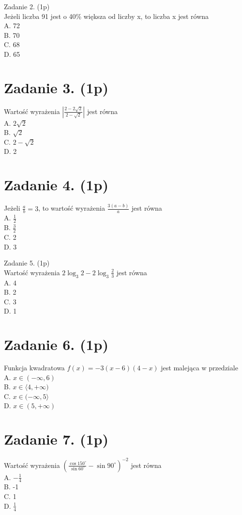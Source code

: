 \documentclass[10pt]{article}
\begin{document}
Zadanie 2. (1p)\\
Jeżeli liczba 91 jest o 40\% większa od liczby x, to liczba x jest równa\\
A. 72\\
B. 70\\
C. 68\\
D. 65

\section*{Zadanie 3. (1p)}
Wartość wyrażenia \(\left|\frac{2-2 \sqrt{2}}{2-\sqrt{2}}\right|\) jest równa\\
A. \(2 \sqrt{2}\)\\
B. \(\sqrt{2}\)\\
C. \(2-\sqrt{2}\)\\
D. 2

\section*{Zadanie 4. (1p)}
Jeżeli \(\frac{a}{b}=3\), to wartość wyrażenia \(\frac{3(a-b)}{a}\) jest równa\\
A. \(\frac{1}{2}\)\\
B. \(\frac{3}{2}\)\\
C. 2\\
D. 3

Zadanie 5. (1p)\\
Wartość wyrażenia \(2 \log _{3} 2-2 \log _{3} \frac{2}{3}\) jest równa\\
A. 4\\
B. 2\\
C. 3\\
D. 1

\section*{Zadanie 6. (1p)}
Funkcja kwadratowa \(f(x)=-3(x-6)(4-x)\) jest malejąca w przedziale\\
A. \(x \in(-\infty, 6)\)\\
B. \(x \in\langle 4,+\infty)\)\\
C. \(x \in(-\infty, 5\rangle\)\\
D. \(x \in(5,+\infty)\)

\section*{Zadanie 7. (1p)}
Wartość wyrażenia \(\left(\frac{\cos 150^{\circ}}{\sin 60^{\circ}}-\sin 90^{\circ}\right)^{-2}\) jest równa\\
A. \(-\frac{1}{4}\)\\
B. -1\\
C. 1\\
D. \(\frac{1}{4}\)
\end{document}
